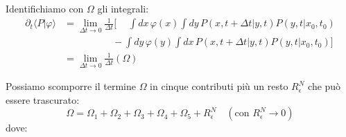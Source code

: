 Identifichiamo con $\Omega$ gli integrali:
\begin{equation}
\begin{aligned}
\partial_t \langle P|\varphi \rangle &= \lim_{\Delta t \rightarrow 0} \frac{1}{\Delta t} \Biggl[
\phantom{-} \int dx \, \varphi(x) \int dy \, P(x,t+\Delta t|y,t)P(y,t|x_0,t_0) \\
& \quad \quad\quad\quad\quad - \int dy \, \varphi(y) \int dx \, P(x,t+\Delta t|y,t) P(y,t|x_0,t_0)
\Biggr] \\ &= \lim_{\Delta t \rightarrow 0} \frac{1}{\Delta t} \left( \Omega \right)
\end{aligned}
\end{equation}

Possiamo scomporre il termine $\Omega$ in cinque contributi più un resto $R^N_{\epsilon}$ che può essere trascurato:
\begin{equation}
\Omega = \Omega_1 + \Omega_2 + \Omega_3 + \Omega_4 + \Omega_5 + R^N_{\epsilon} \quad (\text{con } R^N_{\epsilon} \to 0)
\end{equation}
dove:

